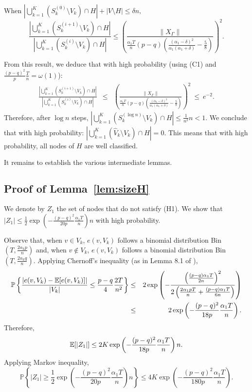 \begin{lemma}  When
${| \bigcup_{k=1}^K (S^{(0)}_k \setminus V_k)\cap H| + |V \setminus
  H|} \le \delta n,$
$$ \frac{ | \bigcup_{k=1}^K (S^{(i+1)}_k \setminus V_k)\cap H|}{
  |\bigcup_{k=1}^K (S^{(i)}_k \setminus V_k)\cap H|} \le \left( \frac{\|X_{\Gamma} \|}{ \frac{\alpha_1 T}{n}(p-q)\left(\frac{(\alpha_1 - \delta)^2}{\alpha_1(\alpha_1 + \delta)} - \frac{5}{8}  \right) } \right)^2.$$ \label{lem:improve}
\end{lemma}

From this result, we deduce that with high probability (using (C1) and $\frac{(p-
  q)^2}{p}\frac{T}{n} = \omega(1)$):
\begin{eqnarray*} 
\frac{ | \bigcup_{k=1}^K (S^{(i+1)}_k \setminus V_k)\cap H|}{
  |\bigcup_{k=1}^K (S^{(i)}_k \setminus V_k)\cap H|} &\le& \left( \frac{\|X_{\Gamma} \|}{ \frac{\alpha_1 T}{n}(p-q)\left(\frac{(\alpha_1 - \delta)^2}{\alpha_1(\alpha_1 + \delta)} - \frac{5}{8}  \right) } \right)^2 ~ \le~ e^{-2}.
\end{eqnarray*}
Therefore, after $\log n$ steps, $|\bigcup_{k=1}^K (S^{(\log n)}_k \setminus V_k)\cap H|
\le \frac{1}{n^{2}} n < 1$. We conclude that with high probability: $|\bigcup_{k=1}^K (\hat{V}_k \setminus V_k)\cap H |= 0.$ This means that with high probability, all nodes of $H$ are well classified. 

It remains to establish the various intermediate lemmas.




\subsection{Proof of Lemma~\ref{lem:sizeH}}
 We denote by $Z_1$ the set of nodes that do not satisfy (H1). 
 We show that $|Z_1|\le \frac{1}{2} \exp \left(-\frac{(p-q)^2 }{20p}\frac{\alpha_1 T}{n}\right)n$ with high probability. 

Observe that, when $v \in V_k$, $e(v,V_k)$ follows a binomial
  distribution Bin$(T, \frac{2 \alpha_k p}{n})$ and,  when $v \notin V_k$, $e(v,V_k)$ follows a binomial
  distribution Bin$(T, \frac{2 \alpha_k q}{n})$. Applying Chernoff's inequality  (as in Lemma 8.1 of \cite{coja2010}),
\begin{eqnarray*}
\mathbb{P}\left\{\frac{\left|e(v,V_k) -{\mathbb E}
      [e(v,V_k)] \right|}{|V_k|} \le
  \frac{p-q}{4}\frac{2T}{n^2} \right\}& \le& 2 \exp \left(
-\frac{\left(\frac{(p-q)\alpha_1 T}{2n}  \right)^2 }{2\left(
    \frac{2\alpha_1 p T }{n} +
    \frac{(p-q)\alpha_1 T}{6n} \right) } \right) \cr
&\le& 2 \exp \left(-\frac{(p-q)^2 }{18p } \frac{\alpha_1 T}{n}\right). 
\end{eqnarray*}
Therefore, 
$${\mathbb E} [| Z_1 |] \le 2K \exp \left(-\frac{(p-q)^2 }{18p } \frac{\alpha_1
    T}{n}\right) n. $$
Applying Markov inequality,
$$\mathbb{P} \left\{ |Z_1 |\ge \frac{1}{2} \exp \left(-\frac{(p-q)^2 }{20p } \frac{\alpha_1
    T}{n}\right)n \right\} \le 4K\exp \left(-\frac{(p-q)^2 }{180p } \frac{\alpha_1
    T}{n}\right). $$

